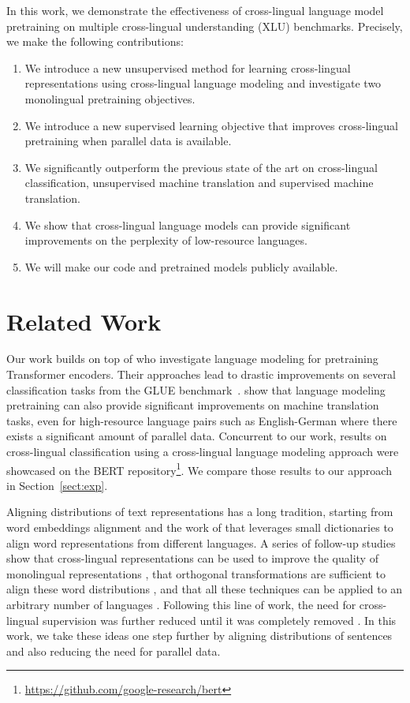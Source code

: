 \documentclass[11pt,a4paper]{article}
\begin{document}
In this work, we demonstrate the effectiveness of cross-lingual language model pretraining on multiple cross-lingual understanding (XLU) benchmarks. Precisely, we make the following contributions:
\begin{enumerate}
    \item We introduce a new unsupervised method for learning cross-lingual representations using cross-lingual language modeling and investigate two monolingual pretraining objectives.
    \item We introduce a new supervised learning objective that improves cross-lingual pretraining when parallel data is available.
    \item We significantly outperform the previous state of the art on cross-lingual classification, unsupervised machine translation and supervised machine translation.
    \item We show that cross-lingual language models can provide significant improvements on the perplexity of low-resource languages.
    \item We will make our code and pretrained models publicly available.
\end{enumerate}

\section{Related Work}
\label{sect:related}

Our work builds on top of \citet{radford2018improving,howard2018universal,devlin2018bert} who investigate language modeling for pretraining Transformer encoders. Their approaches lead to drastic improvements on several classification tasks from the GLUE benchmark~\cite{wang2018glue}. \citet{ramachandran2016unsupervised} show that language modeling pretraining can also provide significant improvements on machine translation tasks, even for high-resource language pairs such as English-German where there exists a significant amount of parallel data. Concurrent to our work, results on cross-lingual classification using a cross-lingual language modeling approach were showcased on the BERT repository\footnote{\url{https://github.com/google-research/bert}}. We compare those results to our approach in Section~\ref{sect:exp}.

Aligning distributions of text representations has a long tradition, starting from word embeddings alignment and the work of \citet{mikolov2013exploiting} that leverages small dictionaries to align word representations from different languages. A series of follow-up studies show that cross-lingual representations can be used to improve the quality of monolingual representations \cite{faruqui2014improving}, that orthogonal transformations are sufficient to align these word distributions \cite{xing2015normalized}, and that all these techniques can be applied to an arbitrary number of languages \cite{ammar2016massively}.
Following this line of work, the need for cross-lingual supervision was further reduced \cite{smith2017offline} until it was completely removed \cite{Conneau:2018:iclr_muse}. In this work, we take these ideas one step further by aligning distributions of sentences and also reducing the need for parallel data.
\end{document}
